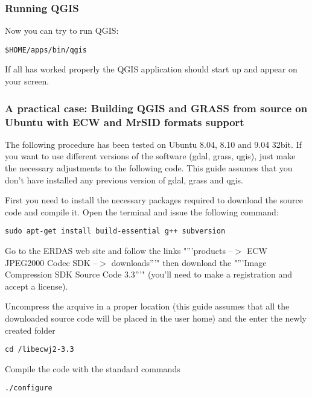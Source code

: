 \hypertarget{toc53}{}
\subsubsection{Running QGIS}
Now you can try to run QGIS:

\begin{verbatim}
$HOME/apps/bin/qgis 
\end{verbatim}

If all has worked properly the QGIS application should start up and appear
on your screen.

\hypertarget{toc54}{}
\subsubsection{A practical case: Building QGIS and GRASS from source on Ubuntu with ECW and MrSID formats support}
The following procedure has been tested on Ubuntu 8.04, 8.10 and 9.04 32bit. If you want 
to use different versions of the software (gdal, grass, qgis), just make the 
necessary adjustments to the following code. This guide assumes that you don't have 
installed any previous version of gdal, grass and qgis.

\hypertarget{toc55}{}
First you need to install the necessary packages required to download the source 
code and compile it. Open the terminal and issue the following command:

\begin{verbatim}
sudo apt-get install build-essential g++ subversion
\end{verbatim}

\hypertarget{toc56}{}
Go to the ERDAS web site  and follow the links
"'''products --$>$ ECW JPEG2000 Codec SDK --$>$ downloads'''" 
then download the "'''Image Compression SDK Source Code 3.3'''" (you'll need to make a registration 
and accept a license).

Uncompress the arquive in a proper location (this guide assumes 
that all the downloaded source code will be placed in the user home) 
and the enter the newly created folder

\begin{verbatim}
cd /libecwj2-3.3
\end{verbatim}

Compile the code with the standard commands

\begin{verbatim}
./configure
\end{verbatim}

